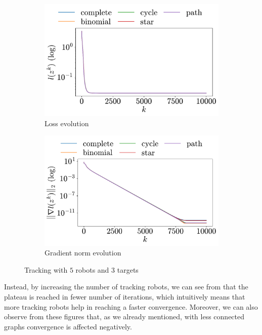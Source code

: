 \documentclass[a4paper,11pt,oneside]{book}
\begin{document}
\begin{figure}[h!]
      \centering
      \begin{subfigure}[h]{0.4\linewidth}
            \centering
            \includegraphics[width=\linewidth]{./figs/tracking/5_3_2/loss.pdf} 
            \caption{Loss evolution}
      \end{subfigure}
      \hfill
      \begin{subfigure}[h]{0.4\linewidth}
            \centering
            \includegraphics[width=\linewidth]{./figs/tracking/5_3_2/gradient.pdf} 
            \caption{Gradient norm evolution}
      \end{subfigure}
      \caption{Tracking with $5$ robots and $3$ targets}
      \label{fig:tracking_5_3}
\end{figure}


Instead, by increasing the number of tracking robots, we can see from  that the plateau is reached in fewer number of iterations, which intuitively means that more tracking robots help in reaching a faster convergence. Moreover, we can also observe from these figures that, as we already mentioned, with less connected graphs convergence is affected negatively.
\end{document}
